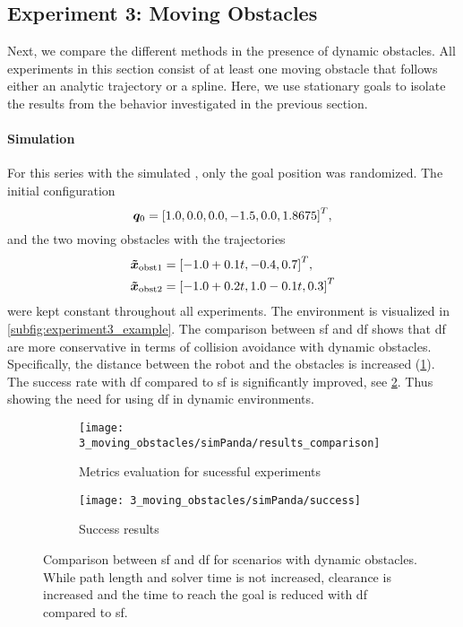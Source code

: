 \subsection{Experiment 3: Moving Obstacles}%
\label{sub:experiment_3_moving_obstacles}
%
Next, we compare the different methods in the presence of dynamic obstacles. All
experiments in this section consist of at least one moving obstacle that follows either an
analytic trajectory or a spline. Here, we use stationary goals to isolate the results from
the behavior investigated in the previous section.

\paragraph{Simulation}
For this series with the simulated \panda{}, 
only the goal position was randomized. The initial configuration 
\[
  \bm{q}_0 = {[1.0, 0.0, 0.0, -1.5, 0.0, 1.8675]}^T, 
\]
and the two moving obstacles with the trajectories
\begin{align*}
  \bm{\tilde{x}}_{\textrm{obst1}} &= {[-1.0 + 0.1t, -0.4, 0.7]}^T,  \\
  \bm{\tilde{x}}_{\textrm{obst2}} &= {[-1.0 + 0.2t, 1.0 - 0.1t, 0.3]}^T
\end{align*}
were kept constant throughout all experiments. The environment is visualized in
\cref{subfig:experiment3_example}. The comparison between \ac{sf} and \ac{df}
shows that \ac{df} are more conservative in terms of collision avoidance with
dynamic obstacles. Specifically, the distance between the robot and the
obstacles is increased (\cref{subfig:experiment3_simPanda_res}).
The success rate with \ac{df} compared to \ac{sf} is significantly improved,
see \cref{subfig:experiment3_simPanda_success}. Thus showing the need for
using \ac{df} in dynamic environments.
%
\begin{figure}[ht]
  \centering
  \begin{subfigure}{1.0\linewidth}
    \centering
    \texttt{[image: 3\_moving\_obstacles/simPanda/results\_comparison]}
    \caption{Metrics evaluation for sucessful experiments}%
    \label{subfig:experiment3_simPanda_res}
  \end{subfigure}
  \begin{subfigure}{1.0\linewidth}
    \centering
    \texttt{[image: 3\_moving\_obstacles/simPanda/success]}
    \caption{Success results}%
    \label{subfig:experiment3_simPanda_success}
  \end{subfigure}
  \caption{Comparison between \ac{sf} and \ac{df} for scenarios with dynamic obstacles.
    While path length and solver time is not increased, clearance is increased and
    the time to reach the goal is reduced with \ac{df} compared to \ac{sf}.
  }%
  \label{fig:experiment3_simPanda}
\end{figure}
%
